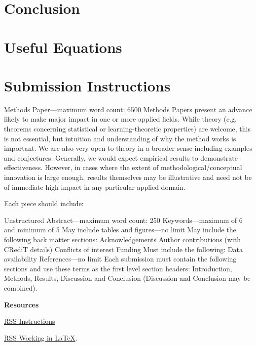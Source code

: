 \documentclass{article}
\begin{document}
\section{Conclusion}

\section{Useful Equations}


\section{Submission Instructions}

Methods Paper—maximum word count: 6500
Methods Papers present an advance likely to make major impact in one or more applied
fields. While theory (e.g. theorems concerning statistical or
learning-theoretic properties) are welcome, this is not essential, but intuition and
understanding of why the method works is important.
We are also very open to theory in a broader sense including examples and conjectures.
Generally, we would expect empirical results to demonstrate effectiveness.
However, in cases where the extent of methodological/conceptual innovation is large
enough, results themselves may be illustrative and need not be of immediate high impact
in any particular applied domain.

Each piece should include:

Unstructured Abstract—maximum word count: 250
Keywords—maximum of 6 and minimum of 5
May include tables and figures—no limit
May include the following back matter sections:
Acknowledgements
Author contributions (with CRediT details)
Conflicts of interest
Funding
Must include the following:
Data availability
References—no limit
Each submission must contain the following sections and use these terms as the first
level section headers: Introduction, Methods, Results, Discussion and Conclusion
(Discussion and Conclusion may be combined).

{\bf Resources}

\href{https://academic.oup.com/rssdat/pages/general-instructions}{RSS Instructions} 

\href{https://academic.oup.com/pages/authoring/books/preparing-your-manuscript/working-in-latex}{RSS Working in \LaTeX}.


\end{document}
